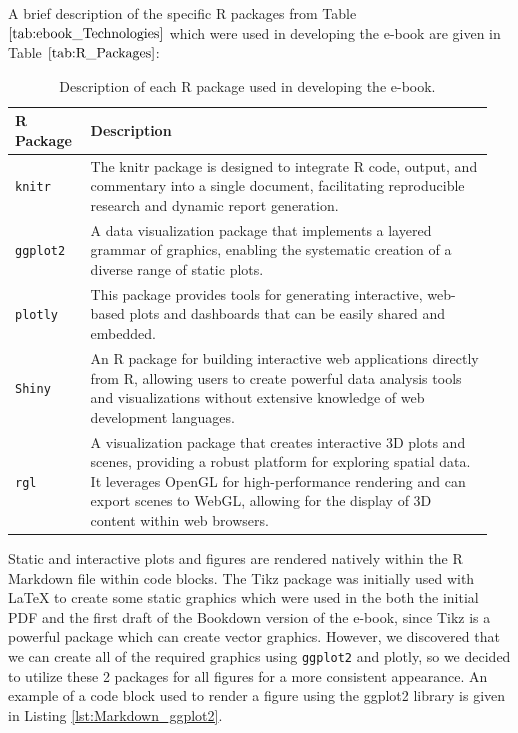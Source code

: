 \documentclass[11pt]{article}
\begin{document}
A brief description of the specific R packages from Table $\ref{tab:ebook_Technologies}$ which were used in developing the e-book are given in Table $\ref{tab:R_Packages}$:
\renewcommand\arraystretch{1.10}
\begin{table}[H]
\setlength{\belowcaptionskip}{-25pt}
\begin{center}
\begin{tabular}{| p{0.15\linewidth} | p{0.8\linewidth} |}
\hline
\textbf{R Package}	&	\textbf{Description}\\
\hline
\texttt{knitr}		&	The knitr package is designed to integrate R code, output, and commentary into a single document, facilitating reproducible research and dynamic report generation.\\
\hline
\texttt{ggplot2}		&	A data visualization package that implements a layered grammar of graphics, enabling the systematic creation of a diverse range of static plots.\\
\hline
\texttt{plotly}		&	This package provides tools for generating interactive, web-based plots and dashboards that can be easily shared and embedded.\\
\hline
\texttt{Shiny}		&	An R package for building interactive web applications directly from R, allowing users to create powerful data analysis tools and visualizations without extensive knowledge of web development languages.\\
\hline
\texttt{rgl}			&	A visualization package that creates interactive 3D plots and scenes, providing a robust platform for exploring spatial data. It leverages OpenGL for high-performance rendering and can export scenes to WebGL, allowing for the display of 3D content within web browsers.\\
\hline
\end{tabular}
\caption{Description of each R package used in developing the e-book.}
\label{tab:R_Packages}
\end{center}
\end{table}
\renewcommand\arraystretch{1.00}
Static and interactive plots and figures are rendered natively within the R Markdown file within code blocks.
The Tikz package was initially used with LaTeX to create some static graphics which were used in the both the initial PDF and the first draft of the Bookdown version of the e-book, since Tikz is a powerful package which can create vector graphics. 
However, we discovered that we can create all of the required graphics using \texttt{ggplot2} and plotly, so we decided to utilize these 2 packages for all figures for a more consistent appearance.
An example of a code block used to render a figure using the ggplot2 library is given in Listing \ref{lst:Markdown_ggplot2}.\\
\end{document}
